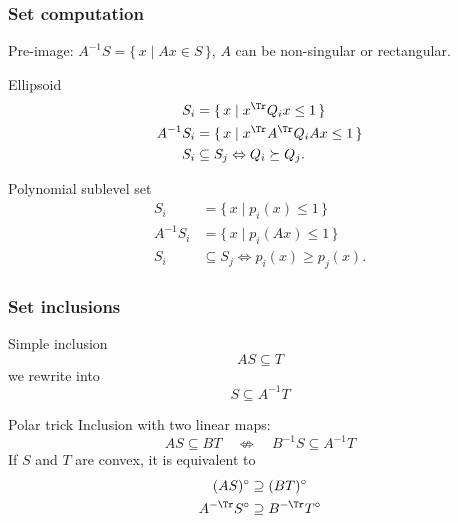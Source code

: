 \documentclass{beamer}
\begin{document}
  \begin{frame}
    \frametitle{Set computation}
		Pre-image: $A^{-1} S = \{\, x \mid Ax \in S \,\}$, $A$ can be non-singular
    or rectangular.

		\begin{block}{Ellipsoid}
			\vspace{-1em}
			\begin{align*}
			  S_i & = \{\, x \mid x^\Tr Q_i x \le 1 \,\}\\
			  A^{-1} S_i & = \{\, x \mid x^\Tr A^\Tr Q_i A x \le 1 \,\}\\
			  S_i & \subseteq S_j \Leftrightarrow Q_i \succeq Q_j.
			\end{align*}
		\end{block}
			\vspace{-1em}
		\begin{block}{Polynomial sublevel set}
			\vspace{-1em}
			\begin{align*}
			  S_i & = \{\, x \mid p_i(x) \le 1 \,\}\\
			  A^{-1} S_i & = \{\, x \mid p_i(Ax) \le 1 \,\}\\
			  S_i & \subseteq S_j \Leftrightarrow p_i(x) \ge p_j(x).
			\end{align*}
		\end{block}
  \end{frame}

  \begin{frame}
    \frametitle{Set inclusions}
		\begin{block}{Simple inclusion}
      \[ A S \subseteq T \]
			we rewrite into
      \[ S \subseteq A^{-1} T \]
		\end{block}
 		\begin{block}{Polar trick}
      Inclusion with two linear maps:
      \[ A S \subseteq B T \quad \not\Leftrightarrow \quad B^{-1} S \subseteq A^{-1} T \]
			If $S$ and $T$ are convex, it is equivalent to
			\begin{align*}
        (A S)^\circ & \supseteq (B T)^\circ\\
        A^{-\Tr} S^\circ & \supseteq B^{-\Tr} T^\circ\\
			\end{align*}
		\end{block}
 \end{frame}
\end{document}
